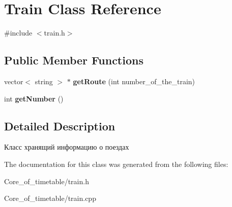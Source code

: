 \hypertarget{class_train}{}\section{Train Class Reference}
\label{class_train}


{\ttfamily \#include $<$train.\+h$>$}

\subsection*{Public Member Functions}
\begin{DoxyCompactItemize}
\item 
vector$<$ string $>$ $\ast$ {\bfseries get\+Route} (int number\+\_\+of\+\_\+the\+\_\+train)\hypertarget{class_train_a1785f2205a7b340378861bc67487f554}{}\label{class_train_a1785f2205a7b340378861bc67487f554}

\item 
int {\bfseries get\+Number} ()\hypertarget{class_train_a4d9c32af8c1a885c7533bf6bba6efe6d}{}\label{class_train_a4d9c32af8c1a885c7533bf6bba6efe6d}

\end{DoxyCompactItemize}


\subsection{Detailed Description}
Класс хранящий информацию о поездах 

The documentation for this class was generated from the following files\+:\begin{DoxyCompactItemize}
\item 
Core\+\_\+of\+\_\+timetable/train.\+h\item 
Core\+\_\+of\+\_\+timetable/train.\+cpp\end{DoxyCompactItemize}
